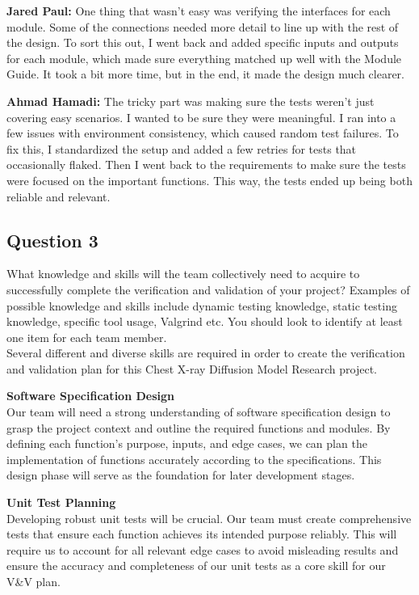 \documentclass[12pt, titlepage]{article}
\begin{document}
\textbf{Jared Paul:} One thing that wasn't easy was verifying the interfaces for each module. Some of the connections needed more detail to line up with the rest of the design. To sort this out, I went back and added specific inputs and outputs for each module, which made sure everything matched up well with the Module Guide. It took a bit more time, but in the end, it made the design much clearer.

\textbf{Ahmad Hamadi:} The tricky part was making sure the tests weren't just covering easy scenarios. I wanted to be sure they were meaningful. I ran into a few issues with environment consistency, which caused random test failures. To fix this, I standardized the setup and added a few retries for tests that occasionally flaked. Then I went back to the requirements to make sure the tests were focused on the important functions. This way, the tests ended up being both reliable and relevant.

\subsection{Question 3}
What knowledge and skills will the team collectively need to acquire to
successfully complete the verification and validation of your project?
Examples of possible knowledge and skills include dynamic testing knowledge,
static testing knowledge, specific tool usage, Valgrind etc.  You should look to
identify at least one item for each team member.\\

Several different and diverse skills are required in order to create the verification and validation plan for this Chest X-ray Diffusion Model Research project.

\textbf{Software Specification Design}\\
Our team will need a strong understanding of software specification design to grasp the project context and outline the required functions and modules. By defining each function's purpose, inputs, and edge cases, we can plan the implementation of functions accurately according to the specifications. This design phase will serve as the foundation for later development stages.

\textbf{Unit Test Planning}\\
Developing robust unit tests will be crucial. Our team must create comprehensive tests that ensure each function achieves its intended purpose reliably. This will require us to account for all relevant edge cases to avoid misleading results and ensure the accuracy and completeness of our unit tests as a core skill for our V\&V plan.
\end{document}
